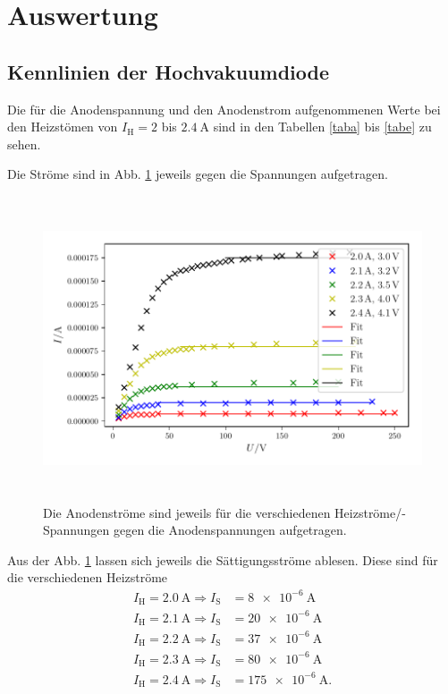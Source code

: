 \section{Auswertung}
\label{sec:Auswertung}

\subsection{Kennlinien der Hochvakuumdiode}
\label{sec:a}
Die für die Anodenspannung und den Anodenstrom aufgenommenen Werte
bei den Heizstömen von $I_\text{H} = \num{2}$ bis $\SI{2.4}{\ampere}$
sind in den Tabellen \ref{taba} bis \ref{tabe} zu sehen.







\noindent Die Ströme sind in Abb. \ref{fig:plot1} jeweils gegen die Spannungen
aufgetragen.
\begin{figure}
    \centering
    \includegraphics[width=15cm, height=9cm]{build/plot1.pdf}
    \caption{Die Anodenströme sind jeweils für die verschiedenen Heizströme/-Spannungen
    gegen die Anodenspannungen aufgetragen.}
    \label{fig:plot1}
\end{figure}

\noindent Aus der Abb. \ref{fig:plot1} lassen sich jeweils
die Sättigungsströme ablesen. Diese sind für die verschiedenen
Heizströme
\begin{align*}
    I_\text{H} = \SI{2.0}{\ampere} \Rightarrow I_\text{S} &= \SI{8e-6}{\ampere} \\
    I_\text{H} = \SI{2.1}{\ampere} \Rightarrow I_\text{S} &= \SI{20e-6}{\ampere} \\
    I_\text{H} = \SI{2.2}{\ampere} \Rightarrow I_\text{S} &= \SI{37e-6}{\ampere} \\
    I_\text{H} = \SI{2.3}{\ampere} \Rightarrow I_\text{S} &= \SI{80e-6}{\ampere} \\
    I_\text{H} = \SI{2.4}{\ampere} \Rightarrow I_\text{S} &= \SI{175e-6}{\ampere}.
\end{align*}

